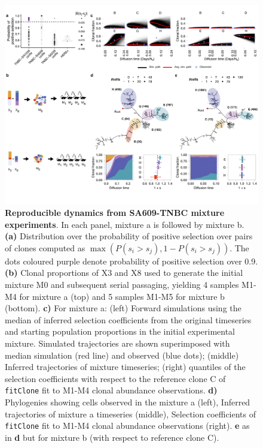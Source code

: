 \begin{figure}
\centering
\includegraphics[width=\textwidth]{Figures/chap4/Mixturenew.png}
	
\caption[Reproducible dynamics from SA609-TNBC mixture experiments]
	{\small
	\textbf{Reproducible dynamics from SA609-TNBC mixture experiments}. In each panel, mixture a is followed by mixture b.
	    \textbf{(a)} Distribution over the probability of positive selection over pairs of clones computed as $\max(P(s_i > s_j), 1-P(s_i > s_j))$. The dots coloured purple denote probability of positive selection over 0.9.
	    \textbf{(b)} Clonal proportions of X3 and X8 used to generate the initial mixture M0 and subsequent serial passaging, yielding 4 samples M1-M4 for mixture a (top) and 5 samples M1-M5 for mixture b (bottom).
	    \textbf{c)} For mixture a: (left) Forward simulations using the median of inferred selection coefficients from the original timeseries and starting population proportions in the initial experimental mixture. Simulated trajectories are shown superimposed with median simulation (red line) and observed (blue dots); (middle) Inferred trajectories of mixture timeseries; (right) quantiles of the selection coefficients with respect to the reference clone C of \texttt{fitClone} fit to M1-M4 clonal abundance observations.
      \textbf{d)} Phylogenies showing cells observed in the mixture a (left), Inferred trajectories of mixture a timeseries (middle), Selection coefficients of \texttt{fitClone} fit to M1-M4 clonal abundance observations (right). \textbf{e} as in \textbf{d} but for mixture b (with respect to reference clone C).}    

	\label{fig:Mixturenew}
\end{figure}

